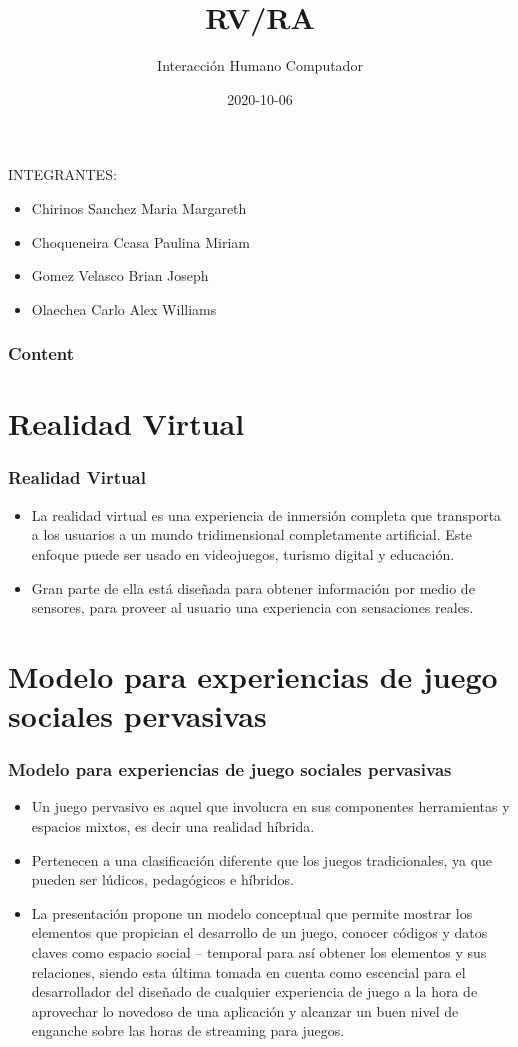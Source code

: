 \documentclass[11pt]{beamer}
\title[RV/RA]{\bf\Huge RV/RA}
\subtitle{Interacción Humano Computador}
\institute[UNSA]
{
\inst{1}%
System Engineering School\\
System Engineering and Informatic Department\\
Production and Services Faculty\\
San Agustin National University of Arequipa
}
\date[2020-10-06]{\scriptsize{2020-10-06}}
\begin{document}
\begin{frame}
\titlepage
\end{frame}

\begin{frame}
\center INTEGRANTES:
\center 

\begin{itemize}
\item Chirinos Sanchez Maria Margareth
\item Choqueneira Ccasa Paulina Miriam
\item Gomez Velasco Brian Joseph
\item Olaechea Carlo Alex Williams
\end{itemize}
\end{frame}


\begin{frame}
\frametitle{Content}
\tableofcontents
\end{frame}

\section{Realidad Virtual}
\begin{frame}
\frametitle{Realidad Virtual}
\begin{itemize}
\item La realidad virtual es una experiencia de inmersión completa que transporta a los usuarios a un mundo tridimensional completamente artificial. Este enfoque puede ser usado en videojuegos, turismo digital y educación.
\item Gran parte de ella está diseñada para obtener información por medio de sensores, para proveer al usuario una experiencia con sensaciones reales. 
\end{itemize}
\end{frame}


\section{Modelo para experiencias de juego sociales pervasivas}
\begin{frame}
\frametitle{Modelo para experiencias de juego sociales pervasivas}
\begin{itemize}
\item Un juego pervasivo es aquel que involucra en sus componentes herramientas y espacios mixtos, es decir una realidad híbrida.
\item Pertenecen a una clasificación diferente que los juegos tradicionales, ya que pueden ser lúdicos, pedagógicos e híbridos.
\item La presentación propone un modelo conceptual
que permite mostrar los elementos que propician el desarrollo de un juego, conocer códigos y datos claves como espacio social – temporal
para así obtener los elementos y sus relaciones, siendo esta última tomada en cuenta como escencial para el desarrollador del diseñado de
cualquier experiencia de juego a la hora de aprovechar lo novedoso
de  una aplicación y alcanzar un buen nivel de enganche sobre las horas de streaming para juegos. 
\end{itemize}
\end{frame}
\end{document}
